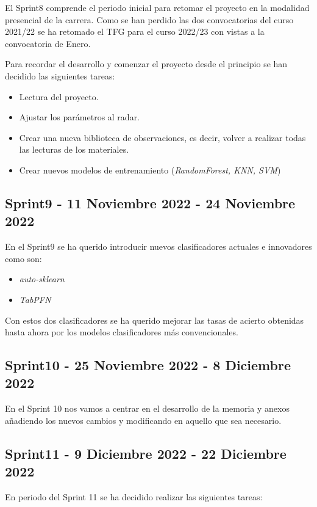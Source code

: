 El Sprint8 comprende el periodo inicial para retomar el proyecto en la modalidad presencial de la carrera. Como se han perdido las dos convocatorias del curso 2021/22 se ha retomado el TFG para el curso 2022/23 con vistas a la convocatoria de Enero.

Para recordar el desarrollo y comenzar el proyecto desde el principio se han decidido las siguientes tareas:

\begin{itemize}
\item Lectura del proyecto.
\item Ajustar los parámetros al radar.
\item Crear una nueva biblioteca de observaciones, es decir, volver a realizar todas las lecturas de los materiales.
\item Crear nuevos modelos de entrenamiento (\textit{RandomForest, KNN, SVM})
\end{itemize}

\subsection{Sprint9 - 11 Noviembre 2022 - 24 Noviembre 2022}

En el Sprint9 se ha querido introducir nuevos clasificadores actuales e innovadores como son:

\begin{itemize}
\item \textit{auto-sklearn}
\item \textit{TabPFN}
\end{itemize}

Con estos dos clasificadores se ha querido mejorar las tasas de acierto obtenidas hasta ahora por los modelos clasificadores más convencionales.

\subsection{Sprint10 - 25 Noviembre 2022 - 8 Diciembre 2022}

En el Sprint 10 nos vamos a centrar en el desarrollo de la memoria y anexos añadiendo los nuevos cambios y modificando en aquello que sea necesario.

\subsection{Sprint11 - 9 Diciembre 2022 - 22 Diciembre 2022}

En periodo del Sprint 11 se ha decidido realizar las siguientes tareas:

